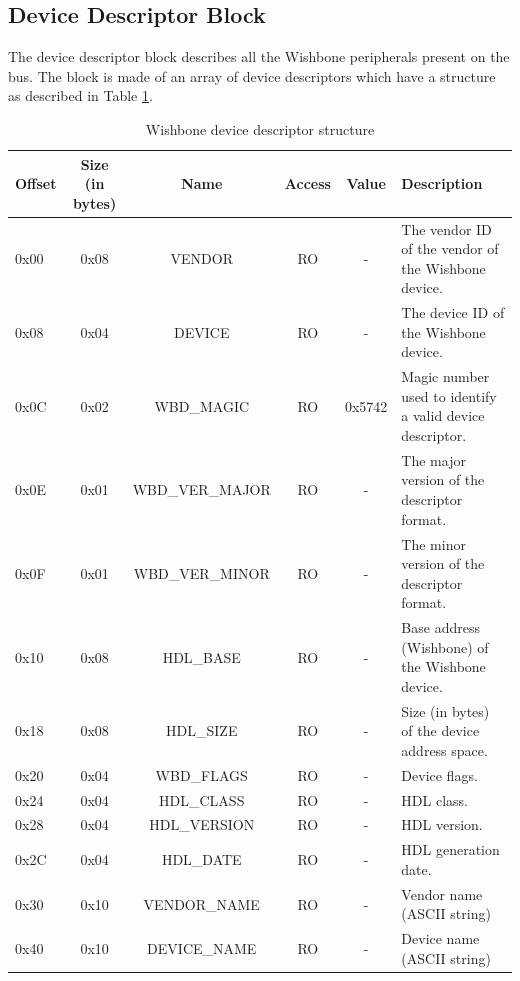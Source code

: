 \documentclass{article}
\begin{document}
\subsection{Device Descriptor Block}\label{device_block}

The device descriptor block describes all the Wishbone peripherals present
on the bus. The block is made of an array of device descriptors which have
a structure as described in Table \ref{dev_desc_struct}.

\begin{center}
	\begin{savenotes}
	\begin{table}[!ht]\footnotesize
	\caption{Wishbone device descriptor structure}\label{dev_desc_struct}\centering
	\begin{tabular}{| l | c | c | c | c | p{5cm} |} \hline
	Offset & Size (in bytes) & Name & Access & Value & Description \\ \hline
	0x00 & 0x08 & VENDOR & RO & - & The vendor ID of the vendor of the Wishbone device. \\ \hline
	0x08 & 0x04 & DEVICE & RO & - & The device ID of the Wishbone device. \\ \hline
	0x0C & 0x02 & WBD\_MAGIC & RO & 0x5742 & Magic number used to identify a valid device descriptor. \\ \hline
	0x0E & 0x01 & WBD\_VER\_MAJOR & RO & - & The major version of the descriptor format. \\ \hline
	0x0F & 0x01 & WBD\_VER\_MINOR & RO & - & The minor version of the descriptor format. \\ \hline
	0x10 & 0x08 & HDL\_BASE & RO & - & Base address (Wishbone) of the Wishbone device. \\ \hline
	0x18 & 0x08 & HDL\_SIZE & RO & - & Size (in bytes) of the device address space. \\ \hline
	0x20 & 0x04 & WBD\_FLAGS & RO & - & Device flags. \\ \hline
	0x24 & 0x04 & HDL\_CLASS & RO & - & HDL class. \\ \hline
	0x28 & 0x04 & HDL\_VERSION & RO & - & HDL version. \\ \hline
	0x2C & 0x04 & HDL\_DATE & RO & - & HDL generation date. \\ \hline
	0x30 & 0x10 & VENDOR\_NAME & RO & - & Vendor name (ASCII string) \\ \hline
	0x40 & 0x10 & DEVICE\_NAME & RO & - & Device name (ASCII string) \\ \hline
	\end{tabular}
	\end{table}
	\end{savenotes}
\end{center}
\end{document}
